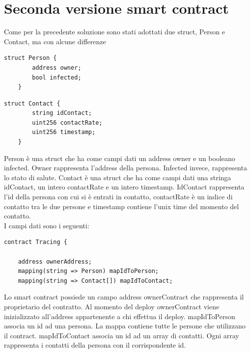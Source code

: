 \section{Seconda versione smart contract}
Come per la precedente soluzione sono stati adottati due struct, Person e Contact, ma con alcune differenze

\begin{lstlisting}[language=Solidity]
    struct Person {
        address owner;
        bool infected;
    }
\end{lstlisting}
\begin{lstlisting}[language=Solidity]
    struct Contact {
        string idContact;
        uint256 contactRate;
        uint256 timestamp;
    }
\end{lstlisting}
Person è una struct che ha come campi dati un address owner e un booleano infected.
Owner rappresenta l’address della persona. Infected invece, rappresenta lo stato di salute.
Contact è una struct che ha come campi dati una stringa idContact, un intero contactRate e un intero timestamp. IdContact rappresenta l’id della persona con cui si è entrati in contatto, contactRate è un indice di contatto tra le due persone e timestamp contiene l’unix time del momento del contatto.\\

I campi dati sono i seguenti:
\begin{lstlisting}[language=Solidity]
contract Tracing {
    
    address ownerAddress;
    mapping(string => Person) mapIdToPerson;
    mapping(string => Contact[]) mapIdToContact;

\end{lstlisting}
Lo smart contract possiede un campo address ownerContract che rappresenta il proprietario del contratto.
Al momento del deploy ownerContract viene inizializzato all’address appartenente a chi effettua il deploy.
mapIdToPerson associa un id ad una persona. La mappa contiene tutte le persone che utilizzano il contract. 
mapIdToContact associa un id ad un array di contatti. Ogni array rappresenta i contatti della persona con il corrispondente id.\\

